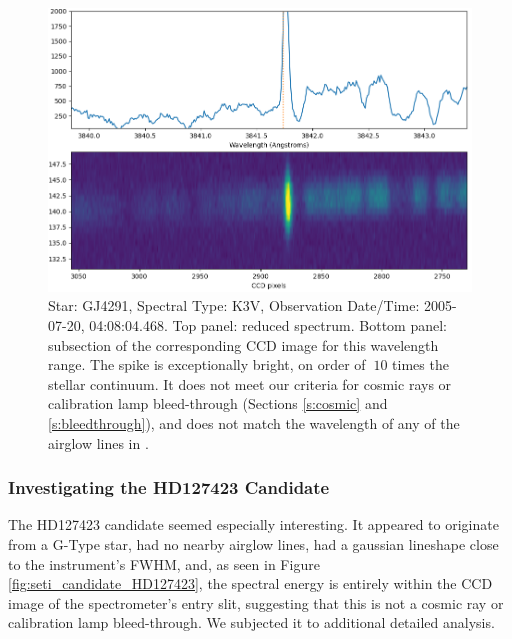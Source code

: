 \documentclass[linenumbers]{aastex631}
\begin{document}
\begin{figure}
    \centering  \includegraphics[width=\textwidth]{3_ADP.2014-10-02T10_02_27.423_zoom (2).png}
    \caption{Star: GJ4291, Spectral Type: K3V, Observation Date/Time: 2005-07-20, 04:08:04.468.  Top panel: reduced spectrum.  Bottom panel: subsection of the corresponding CCD image for this wavelength range. The spike is exceptionally bright, on order of $~10$ times the stellar continuum. It does not meet our criteria for cosmic rays or calibration lamp bleed-through (Sections \ref{s:cosmic} and \ref{s:bleedthrough}), and does not match the wavelength of any of the airglow lines in \cite{faint_airglow_database}.}
    \label{fig:seti_candidate_GJ4291}
\end{figure}

\subsubsection{Investigating the HD127423 Candidate} 
\label{s:hd127423}

The HD127423 candidate seemed especially interesting.  It appeared to originate from a G-Type star, had no nearby airglow lines, had a gaussian lineshape close to the instrument's FWHM, and, as seen in Figure \ref{fig:seti_candidate_HD127423}, the spectral energy is entirely within the CCD image of the spectrometer's entry slit, suggesting that this is not a cosmic ray or calibration lamp bleed-through.  We subjected it to additional detailed analysis.
\end{document}

